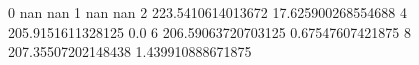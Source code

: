 0 nan nan
1 nan nan
2 223.5410614013672 17.625900268554688
4 205.9151611328125 0.0
6 206.59063720703125 0.67547607421875
8 207.35507202148438 1.439910888671875
